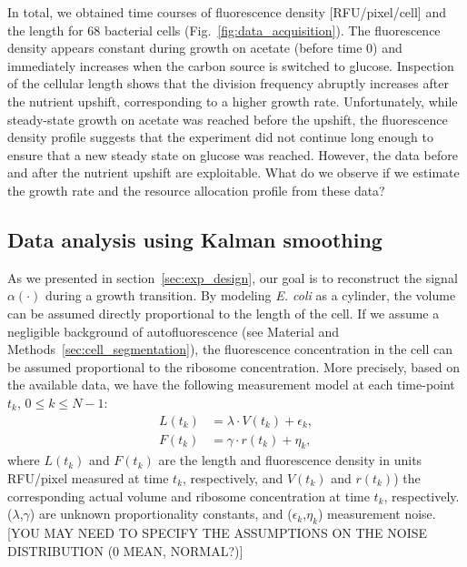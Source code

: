 In total, we obtained time courses of fluorescence density [RFU/pixel/cell] and the length for 68 bacterial cells (Fig.~\ref{fig:data_acquisition}).
The fluorescence density appears constant during growth on acetate (before time 0) and immediately increases when the carbon source is switched to glucose.
Inspection of the cellular length shows that the division frequency abruptly increases after the nutrient upshift, corresponding to a higher growth rate.
Unfortunately, while steady-state growth on acetate was reached before the upshift, the fluorescence density profile suggests that the experiment did not continue long enough to ensure that a new steady state on glucose was reached.
However, the data before and after the nutrient upshift are exploitable.
What do we observe if we estimate the growth rate and the resource allocation profile from these data?

\subsection{Data analysis using Kalman smoothing}
\label{sec:res_kalman}

As we presented in section~\ref{sec:exp_design}, our goal is to reconstruct the signal $\alpha (\cdot)$ during a growth transition.
By modeling \textit{E. coli} as a cylinder, the volume can be assumed directly proportional to the length of the cell.
If we assume a negligible background of autofluorescence (see Material and Methods~\ref{sec:cell_segmentation}), the fluorescence concentration in the cell can be assumed proportional to the ribosome concentration.
More precisely, based on the available data, we have the following measurement model at each time-point $t_k$, $0\leq k \leq N-1$:
\begin{eqnarray}
L(t_k) &= \lambda \cdot V(t_k) + \epsilon_k, \label{eq:mes_L}\\
F(t_k) &= \gamma \cdot r(t_k) + \eta_k, \label{eq:mes_F}
\end{eqnarray}
where $L(t_k)$ and $F(t_k)$ are the length and fluorescence density in units RFU/pixel measured at time $t_k$, respectively,  and $V(t_k)$  and $r(t_k)$) the corresponding actual volume and ribosome concentration at time $t_k$, respectively. ($\lambda$,$\gamma$) are unknown proportionality constants, and ($\epsilon_k$,$\eta_k$) measurement noise. [YOU MAY NEED TO SPECIFY THE ASSUMPTIONS ON THE NOISE DISTRIBUTION (0 MEAN, NORMAL?)]

